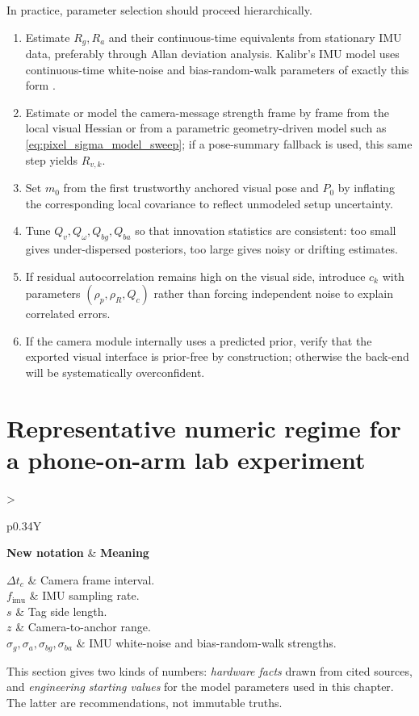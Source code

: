 \documentclass[11pt]{report}
\newcommand{\NotationTable}[1]{%
\vspace{0.6mm}
{\scriptsize
\setlength{\tabcolsep}{2.5pt}
\begin{tabularx}{\columnwidth}{>{\raggedright\arraybackslash}p{0.34\columnwidth}Y}
\toprule
\textbf{New notation} & \textbf{Meaning}\\
\midrule
#1\\
\bottomrule
\end{tabularx}}
\vspace{0.8mm}}
\begin{document}
In practice, parameter selection should proceed hierarchically.
\begin{enumerate}
  \item Estimate $R_g,R_a$ and their continuous-time equivalents from stationary IMU data, preferably through Allan deviation analysis. Kalibr's IMU model uses continuous-time white-noise and bias-random-walk parameters of exactly this form \citep{kalibr_noise}.
  \item Estimate or model the camera-message strength frame by frame from the local visual Hessian or from a parametric geometry-driven model such as \eqref{eq:pixel_sigma_model_sweep}; if a pose-summary fallback is used, this same step yields $R_{v,k}$.
  \item Set $m_0$ from the first trustworthy anchored visual pose and $P_0$ by inflating the corresponding local covariance to reflect unmodeled setup uncertainty.
  \item Tune $Q_v,Q_\omega,Q_{bg},Q_{ba}$ so that innovation statistics are consistent: too small gives under-dispersed posteriors, too large gives noisy or drifting estimates.
  \item If residual autocorrelation remains high on the visual side, introduce $c_k$ with parameters $(\rho_p,\rho_R,Q_c)$ rather than forcing independent noise to explain correlated errors.
  \item If the camera module internally uses a predicted prior, verify that the exported visual interface is prior-free by construction; otherwise the back-end will be systematically overconfident.
\end{enumerate}

\section{Representative numeric regime for a phone-on-arm lab experiment}
\NotationTable{
$\Delta t_c$ & Camera frame interval.\\
$f_{\mathrm{imu}}$ & IMU sampling rate.\\
$s$ & Tag side length.\\
$z$ & Camera-to-anchor range.\\
$\sigma_g,\sigma_a,\sigma_{bg},\sigma_{ba}$ & IMU white-noise and bias-random-walk strengths.}

This section gives two kinds of numbers: \emph{hardware facts} drawn from cited sources, and \emph{engineering starting values} for the model parameters used in this chapter. The latter are recommendations, not immutable truths.
\end{document}
